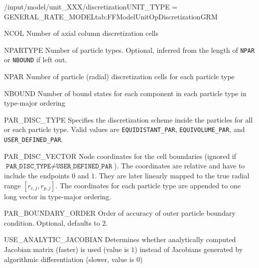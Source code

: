 \begin{condsubgroup}{/input/model/unit\_XXX/discretization}{UNIT\_TYPE = GENERAL\_RATE\_MODEL}{tab:FFModelUnitOpDiscretizationGRM}
  \begin{dataset}[type=int,range={$\geq 1$},length=1]{NCOL}
    Number of axial column discretization cells
  \end{dataset}
  \begin{dataset}[type=int,range={$\geq 1$},length=1]{NPARTYPE}
    Number of particle types.
    Optional, inferred from the length of \texttt{NPAR} or \texttt{NBOUND} if left out.
  \end{dataset}
  \begin{dataset}[type=int,range={$\geq 1$},length={$1$ / \texttt{NPARTYPE}}]{NPAR}
    Number of particle (radial) discretization cells for each particle type
  \end{dataset}
  \begin{dataset}[type=int,range={$\geq 0$},length={\texttt{NCOMP} / $\texttt{NPARTYPE} \cdot \texttt{NCOMP}$}]{NBOUND}
    Number of bound states for each component in each particle type in type-major ordering
  \end{dataset}
  \begin{dataset}[type=string,length={$1$ / \texttt{NPARTYPE}}]{PAR\_DISC\_TYPE}
    Specifies the discretization scheme inside the particles for all or each particle type.
    Valid values are \texttt{EQUIDISTANT\_PAR}, \texttt{EQUIVOLUME\_PAR}, and \texttt{USER\_DEFINED\_PAR}.
  \end{dataset}
  \begin{dataset}[unit=--,type=double,range={$[0,1]$},length={$\sum_i (\texttt{NPAR}_i + 1)$}]{PAR\_DISC\_VECTOR}
    Node coordinates for the cell boundaries (ignored if $\texttt{PAR\_DISC\_TYPE} \neq \texttt{USER\_DEFINED\_PAR}$).
    The coordinates are relative and have to include the endpoints $0$ and $1$.
    They are later linearly mapped to the true radial range $[r_{c,j}, r_{p,j}]$.
    The coordinates for each particle type are appended to one long vector in type-major ordering.
  \end{dataset}
  \begin{dataset}[type=int,range={$\{ 1,2 \}$},length={1}]{PAR\_BOUNDARY\_ORDER}
    Order of accuracy of outer particle boundary condition.
    Optional, defaults to $2$.
  \end{dataset}
  \begin{dataset}[type=int,range={$\{0, 1\}$},length=1]{USE\_ANALYTIC\_JACOBIAN}
    Determines whether analytically computed Jacobian matrix (faster) is used (value is $1$) instead of Jacobians generated by algorithmic differentiation (slower, value is $0$)

\end{dataset}
\end{condsubgroup}
